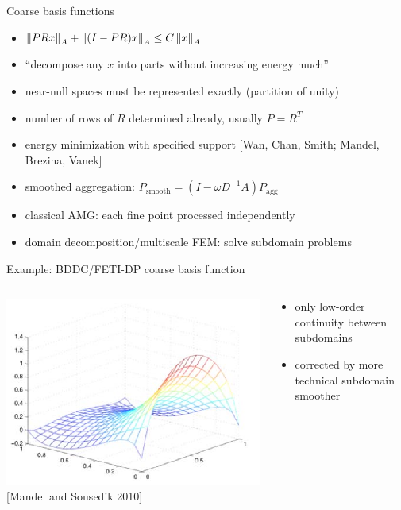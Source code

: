 \documentclass{beamer}
\begin{document}
\begin{frame}{Coarse basis functions}
  \begin{itemize}
  \item $\left\lVert PR x \right\rVert_A + \left\lVert (I - PR)x \right\rVert_A \le C \left\lVert x \right\rVert_A$
  \item ``decompose any $x$ into parts without increasing energy much''
  \item near-null spaces must be represented exactly (partition of unity)
  \item number of rows of $R$ determined already, usually $P = R^T$
  \item energy minimization with specified support [Wan, Chan, Smith; Mandel, Brezina, Vanek]
  \item smoothed aggregation: $P_{\text{smooth}} = (I - \omega D^{-1} A) P_{\text{agg}}$
  \item classical AMG: each fine point processed independently
  \item domain decomposition/multiscale FEM: solve subdomain problems
  \end{itemize}
\end{frame}

\begin{frame}{Example: BDDC/FETI-DP coarse basis function}
    \begin{columns}
    \begin{column}{0.6\textwidth}
      \includegraphics[width=\textwidth]{figures/MandelSousedikBDDCCoarseBasis} \\
      {\small [Mandel and Sousedik 2010]}
    \end{column}
    \begin{column}{0.4\textwidth}
      \begin{itemize}
      \item only low-order continuity between subdomains
      \item corrected by more technical subdomain smoother
      \end{itemize}
    \end{column}
  \end{columns}
\end{frame}
\end{document}
